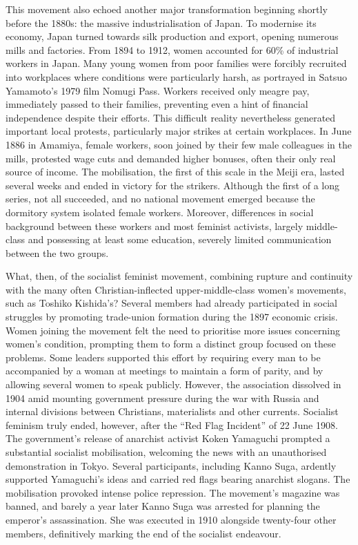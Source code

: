 \documentclass[11pt,a4paper]{article}
\begin{document}
This movement also echoed another major transformation beginning shortly before the 1880s: the massive industrialisation of Japan. To modernise its economy, Japan turned towards silk production and export, opening numerous mills and factories. From 1894 to 1912, women accounted for 60\% of industrial workers in Japan. Many young women from poor families were forcibly recruited into workplaces where conditions were particularly harsh, as portrayed in Satsuo Yamamoto's 1979 film Nomugi Pass. Workers received only meagre pay, immediately passed to their families, preventing even a hint of financial independence despite their efforts. This difficult reality nevertheless generated important local protests, particularly major strikes at certain workplaces. In June 1886 in Amamiya, female workers, soon joined by their few male colleagues in the mills, protested wage cuts and demanded higher bonuses, often their only real source of income. The mobilisation, the first of this scale in the Meiji era, lasted several weeks and ended in victory for the strikers. Although the first of a long series, not all succeeded, and no national movement emerged because the dormitory system isolated female workers. Moreover, differences in social background between these workers and most feminist activists, largely middle-class and possessing at least some education, severely limited communication between the two groups.

What, then, of the socialist feminist movement, combining rupture and continuity with the many often Christian-inflected upper-middle-class women's movements, such as Toshiko Kishida's? Several members had already participated in social struggles by promoting trade-union formation during the 1897 economic crisis. Women joining the movement felt the need to prioritise more issues concerning women's condition, prompting them to form a distinct group focused on these problems. Some leaders supported this effort by requiring every man to be accompanied by a woman at meetings to maintain a form of parity, and by allowing several women to speak publicly. However, the association dissolved in 1904 amid mounting government pressure during the war with Russia and internal divisions between Christians, materialists and other currents. Socialist feminism truly ended, however, after the ``Red Flag Incident'' of 22 June 1908. The government's release of anarchist activist Koken Yamaguchi prompted a substantial socialist mobilisation, welcoming the news with an unauthorised demonstration in Tokyo. Several participants, including Kanno Suga, ardently supported Yamaguchi's ideas and carried red flags bearing anarchist slogans. The mobilisation provoked intense police repression. The movement's magazine was banned, and barely a year later Kanno Suga was arrested for planning the emperor's assassination. She was executed in 1910 alongside twenty-four other members, definitively marking the end of the socialist endeavour.
\end{document}
